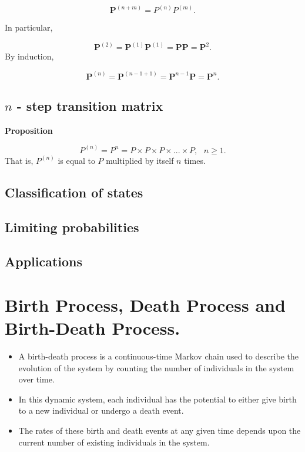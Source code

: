 \documentclass[
  letterpaper,
  DIV=11,
  numbers=noendperiod]{scrreprt}
\begin{document}
\[\mathbf{P}^{(n+m)}=P^{(n)}P^{(m)}.\]

In particular,

\[\mathbf{P}^{(2)}=\mathbf{P}^{(1)}\mathbf{P}^{(1)}=\mathbf{P}\mathbf{P}=\mathbf{P}^2.\]
By induction,

\[\mathbf{P}^{(n)}=\mathbf{P}^{(n-1+1)}=\mathbf{P}^{n-1}\mathbf{P}=\mathbf{P}^n.\]

\section{\texorpdfstring{\(n\) - step transition
matrix}{n - step transition matrix}}\label{n---step-transition-matrix-1}

\textbf{Proposition}

\[P^{(n)} = P^n = P \times P \times P \times ... \times P, \text{ } n \geq 1.\]
That is, \(P^{(n)}\) is equal to \(P\) multiplied by itself \(n\) times.

\section{Classification of states}\label{classification-of-states}

\section{Limiting probabilities}\label{limiting-probabilities}

\section{Applications}\label{applications}


\chapter{Birth Process, Death Process and Birth-Death
Process.}\label{birth-process-death-process-and-birth-death-process.}

\begin{itemize}
\item
  A birth-death process is a continuous-time Markov chain used to
  describe the evolution of the system by counting the number of
  individuals in the system over time.
\item
  In this dynamic system, each individual has the potential to either
  give birth to a new individual or undergo a death event.
\item
  The rates of these birth and death events at any given time depends
  upon the current number of existing individuals in the system.
\end{itemize}
\end{document}

